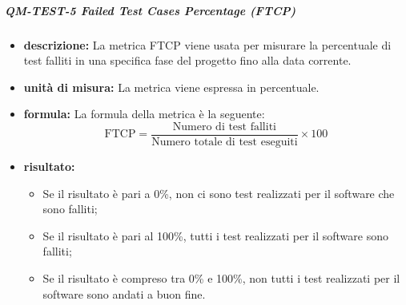            \subparagraph{QM-TEST-5 Failed Test Cases Percentage (FTCP)}
            \begin{itemize}
                \item \textbf{descrizione: }
                La metrica FTCP viene usata per misurare la percentuale di test falliti in una specifica fase del progetto fino alla data corrente.

                \item \textbf{unità di misura: }
                La metrica viene espressa in percentuale.

                \item \textbf{formula: }
                La formula della metrica è la seguente:
                \[
                    \text{FTCP} = \frac{\text{Numero di test falliti}}{\text{Numero totale di test eseguiti}} \times 100
                \]

                \item \textbf{risultato: }
                \begin{itemize}
                    \item Se il risultato è pari a 0\%, non ci sono test realizzati per il software che sono falliti;
                    \item Se il risultato è pari al 100\%, tutti i test realizzati per il software sono falliti;
                    \item Se il risultato è compreso tra 0\% e 100\%, non tutti i test realizzati per il software sono andati a buon fine.
                \end{itemize}
            \end{itemize}

